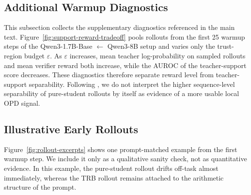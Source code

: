 \documentclass{llmxive}
\begin{document}
\subsection{Additional Warmup Diagnostics}
\label{app:warmup_diagnostics}

This subsection collects the supplementary diagnostics referenced in the main text.
Figure~\ref{fig:support-reward-tradeoff} pools rollouts from the first 25 warmup steps of the Qwen3-1.7B-Base $\leftarrow$ Qwen3-8B setup and varies only the trust-region budget $\varepsilon$.
As $\varepsilon$ increases, mean teacher log-probability on sampled rollouts and mean verifier reward both increase, while the AUROC of the teacher-support score decreases.
These diagnostics therefore separate reward level from teacher-support separability.
Following \citet{li2026rethinking}, we do not interpret the higher sequence-level separability of pure-student rollouts by itself as evidence of a more usable local OPD signal.


\subsection{Illustrative Early Rollouts}
\label{app:qualitative_rollouts}

Figure~\ref{fig:rollout-excerpts} shows one prompt-matched example from the first warmup step.
We include it only as a qualitative sanity check, not as quantitative evidence.
In this example, the pure-student rollout drifts off-task almost immediately, whereas the TRB rollout remains attached to the arithmetic structure of the prompt.
\end{document}
